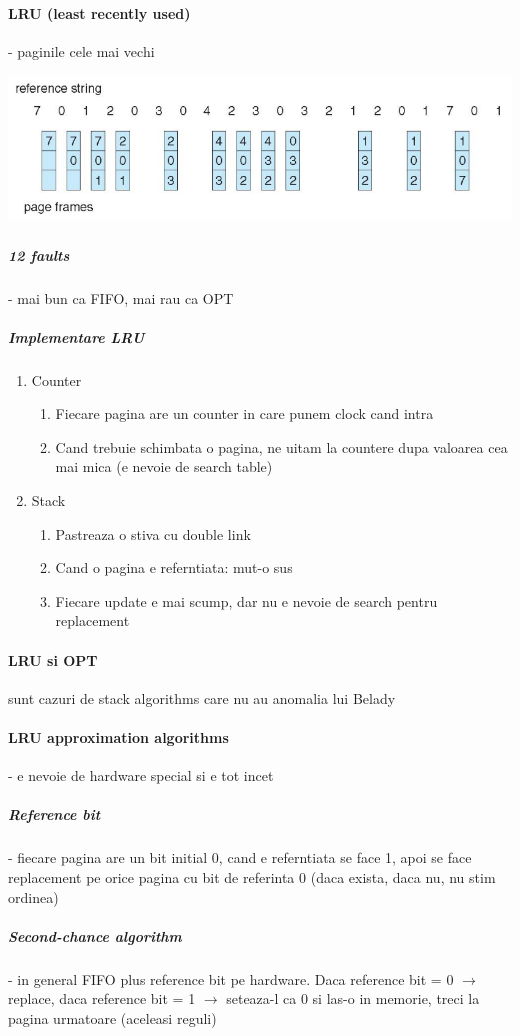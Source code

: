 \documentclass{article}
\begin{document}
\paragraph*{LRU (least recently used)} - paginile cele mai vechi
\begin{center}
    \includegraphics[scale=0.4]{36-lrupf.png}
\end{center}
\subparagraph*{12 faults} - mai bun ca FIFO, mai rau ca OPT
\subparagraph*{Implementare LRU}
\begin{enumerate}
    \item Counter
    \begin{enumerate}
        \item Fiecare pagina are un counter in care punem clock cand intra
        \item Cand trebuie schimbata o pagina, ne uitam la countere dupa valoarea cea mai mica (e nevoie de search table)
    \end{enumerate}
    \item Stack
    \begin{enumerate}
        \item Pastreaza o stiva cu double link
        \item Cand o pagina e referntiata: mut-o sus
        \item Fiecare update e mai scump, dar nu e nevoie de search pentru replacement
    \end{enumerate}
\end{enumerate}

\paragraph*{LRU si OPT} sunt cazuri de stack algorithms care nu au anomalia lui Belady

\paragraph*{LRU approximation algorithms} - e nevoie de hardware special si e tot incet
\subparagraph*{Reference bit} - fiecare pagina are un bit initial 0, cand e referntiata se face 1, apoi se face replacement pe orice pagina cu bit de referinta 0 (daca exista, daca nu, nu stim ordinea)
\subparagraph*{Second-chance algorithm} - in general FIFO plus reference bit pe hardware. Daca reference bit = 0 $\rightarrow$ replace, daca reference bit = 1 $\rightarrow$ seteaza-l ca 0 si las-o in memorie, treci la pagina urmatoare (aceleasi reguli)
\end{document}
